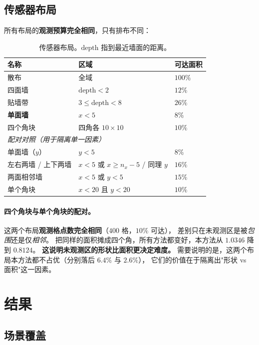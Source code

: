 \documentclass[11pt,a4paper]{article}
\begin{document}
\subsection{传感器布局}

所有布局的\textbf{观测预算完全相同}，只有排布不同：

\begin{table}[t]
\centering
\caption{传感器布局。$\mathrm{depth}$ 指到最近墙面的距离。}
\label{tab:layouts}
\begin{tabular}{lll}
\toprule
名称 & 区域 & 可达面积 \\
\midrule
散布 & 全域 & $100\%$ \\
四面墙 & $\mathrm{depth} < 2$ & $12\%$ \\
贴墙带 & $3 \le \mathrm{depth} < 8$ & $26\%$ \\
\textbf{单面墙} & $x < 5$ & $8\%$ \\
四个角块 & 四角各 $10\times10$ & $10\%$ \\
\midrule
\multicolumn{3}{l}{\emph{配对对照（用于隔离单一因素）}} \\
单面墙（$y$） & $y < 5$ & $8\%$ \\
左右两墙 / 上下两墙 & $x<5$ 或 $x \ge n_x-5$ / 同理 $y$ & $16\%$ \\
两面相邻墙 & $x<5$ 或 $y<5$ & $15\%$ \\
单个角块 & $x<20$ 且 $y<20$ & $10\%$ \\
\bottomrule
\end{tabular}
\end{table}

\paragraph{四个角块与单个角块的配对。}
这两个布局\textbf{观测格点数完全相同}（$400$ 格，$10\%$ 可达），
差别只在未观测区是被\emph{包围}还是仅\emph{相邻}。
把同样的面积摊成四个角，所有方法都变好，本方法从 $1.0346$ 降到 $0.8124$。
\textbf{这说明未观测区的形状比面积更决定难度。}
需要说明的是，这两个布局本方法都不占优（分别落后 $6.4\%$ 与 $2.6\%$），
它们的价值在于隔离出"形状 vs 面积"这一因素。

\section{结果}

\subsection{场景覆盖}
\end{document}
